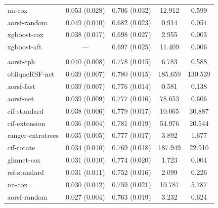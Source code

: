 \documentclass{article}\usepackage[]{graphicx}\usepackage[]{xcolor}
\newenvironment{knitrout}{}{} %
\begin{document}
\begin{knitrout}
\begin{longtable}[t]{lcccc}
\hspace{1em}nn-cox & 0.053 (0.028) & 0.706 (0.032) & 12.912 & 0.599\\
\hspace{1em}aorsf-random & 0.049 (0.010) & 0.682 (0.023) & 0.914 & 0.054\\
\hspace{1em}xgboost-cox & 0.038 (0.017) & 0.698 (0.027) & 2.955 & 0.003\\
\hspace{1em}xgboost-aft & --- & 0.697 (0.025) & 11.409 & 0.006\\
\addlinespace[0.3em]
\multicolumn{5}{l}{\textit{\textbf{JHS; coronary heart disease, n = 3501, p = 80}}}\\
\hline
\hspace{1em}aorsf-cph & 0.040 (0.008) & 0.778 (0.015) & 6.783 & 0.588\\
\hspace{1em}obliqueRSF-net & 0.039 (0.007) & 0.780 (0.015) & 185.659 & 130.539\\
\hspace{1em}aorsf-fast & 0.039 (0.007) & 0.776 (0.014) & 0.581 & 0.138\\
\hspace{1em}aorsf-net & 0.039 (0.009) & 0.777 (0.016) & 78.653 & 0.606\\
\hspace{1em}cif-standard & 0.038 (0.006) & 0.779 (0.017) & 10.065 & 30.887\\
\hspace{1em}cif-extension & 0.036 (0.004) & 0.781 (0.019) & 54.976 & 20.544\\
\hspace{1em}ranger-extratrees & 0.035 (0.005) & 0.777 (0.017) & 3.892 & 1.677\\
\hspace{1em}cif-rotate & 0.034 (0.010) & 0.769 (0.018) & 187.949 & 22.910\\
\hspace{1em}glmnet-cox & 0.031 (0.010) & 0.774 (0.020) & 1.723 & 0.004\\
\hspace{1em}rsf-standard & 0.031 (0.011) & 0.752 (0.016) & 2.099 & 0.226\\
\hspace{1em}nn-cox & 0.030 (0.012) & 0.759 (0.021) & 10.787 & 5.787\\
\hspace{1em}aorsf-random & 0.027 (0.004) & 0.763 (0.019) & 3.232 & 0.624\\

\end{longtable}
\end{knitrout}
\end{document}
